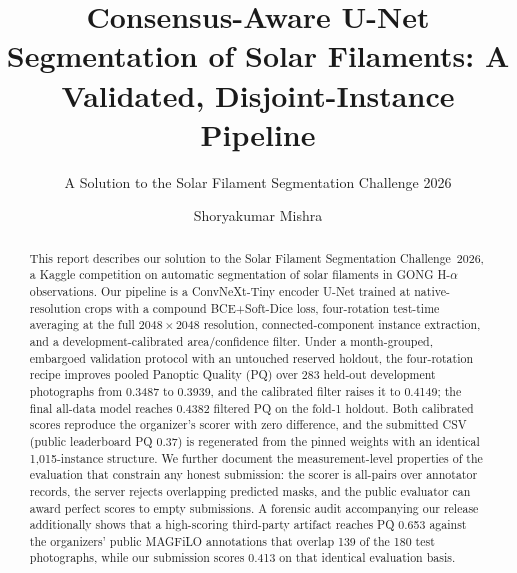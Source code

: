 \documentclass[sigconf]{acmart}
\begin{document}
\title[Consensus-Aware U-Net Segmentation of Solar Filaments]{Consensus-Aware U-Net Segmentation of Solar Filaments: A Validated, Disjoint-Instance Pipeline}
\subtitle{A Solution to the Solar Filament Segmentation Challenge 2026} %



\author{Shoryakumar Mishra}


\begin{abstract}
    This report describes our solution to the Solar Filament Segmentation Challenge~2026, a Kaggle competition on automatic segmentation of solar filaments in GONG H-$\alpha$ observations.
    Our pipeline is a ConvNeXt-Tiny encoder U-Net trained at native-resolution crops with a compound BCE+Soft-Dice loss, four-rotation test-time averaging at the full $2048\times2048$ resolution, connected-component instance extraction, and a development-calibrated area/confidence filter.
    Under a month-grouped, embargoed validation protocol with an untouched reserved holdout, the four-rotation recipe improves pooled Panoptic Quality (PQ) over 283 held-out development photographs from 0.3487 to 0.3939, and the calibrated filter raises it to 0.4149; the final all-data model reaches 0.4382 filtered PQ on the fold-1 holdout.
    Both calibrated scores reproduce the organizer's scorer with zero difference, and the submitted CSV (public leaderboard PQ 0.37) is regenerated from the pinned weights with an identical 1{,}015-instance structure.
    We further document the measurement-level properties of the evaluation that constrain any honest submission: the scorer is all-pairs over annotator records, the server rejects overlapping predicted masks, and the public evaluator can award perfect scores to empty submissions.
    A forensic audit accompanying our release additionally shows that a high-scoring third-party artifact reaches PQ 0.653 against the organizers' public MAGFiLO annotations that overlap 139 of the 180 test photographs, while our submission scores 0.413 on that identical evaluation basis.
\end{abstract}


\maketitle


\ifguideStyle
{}
\par\medskip
\fi
\end{document}

